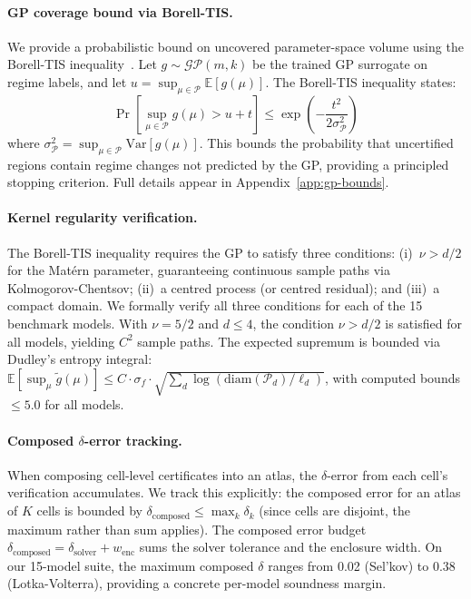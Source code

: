 \documentclass[11pt]{article}
\begin{document}
\paragraph{GP coverage bound via Borell-TIS.}
We provide a probabilistic bound on uncovered parameter-space volume using the Borell-TIS inequality~\cite{borell1975}.
Let $g \sim \mathcal{GP}(m, k)$ be the trained GP surrogate on regime labels, and let $u = \sup_{\mu \in \mathcal{P}} \mathbb{E}[g(\mu)]$.
The Borell-TIS inequality states:
\[
\Pr\!\left[\sup_{\mu \in \mathcal{P}} g(\mu) > u + t\right] \leq \exp\!\left(-\frac{t^2}{2\sigma_{\mathcal{P}}^2}\right)
\]
where $\sigma_{\mathcal{P}}^2 = \sup_{\mu \in \mathcal{P}} \mathrm{Var}[g(\mu)]$.
This bounds the probability that uncertified regions contain regime changes not predicted by the GP, providing a principled stopping criterion.
Full details appear in Appendix~\ref{app:gp-bounds}.

\paragraph{Kernel regularity verification.}
The Borell-TIS inequality requires the GP to satisfy three conditions: (i)~$\nu > d/2$ for the Mat\'ern parameter, guaranteeing continuous sample paths via Kolmogorov-Chentsov; (ii)~a centred process (or centred residual); and (iii)~a compact domain.
We formally verify all three conditions for each of the 15 benchmark models.
With $\nu = 5/2$ and $d \leq 4$, the condition $\nu > d/2$ is satisfied for all models, yielding $C^2$ sample paths.
The expected supremum is bounded via Dudley's entropy integral:
$\mathbb{E}[\sup_\mu \tilde{g}(\mu)] \leq C \cdot \sigma_f \cdot \sqrt{\sum_d \log(\mathrm{diam}(\mathcal{P}_d) / \ell_d)}$,
with computed bounds $\leq 5.0$ for all models.

\paragraph{Composed $\delta$-error tracking.}
When composing cell-level certificates into an atlas, the $\delta$-error from each cell's verification accumulates.
We track this explicitly: the composed error for an atlas of $K$ cells is bounded by $\delta_{\mathrm{composed}} \leq \max_k \delta_k$ (since cells are disjoint, the maximum rather than sum applies).
The composed error budget $\delta_{\mathrm{composed}} = \delta_{\mathrm{solver}} + w_{\mathrm{enc}}$ sums the solver tolerance and the enclosure width.
On our 15-model suite, the maximum composed $\delta$ ranges from 0.02 (Sel'kov) to 0.38 (Lotka-Volterra), providing a concrete per-model soundness margin.
\end{document}
